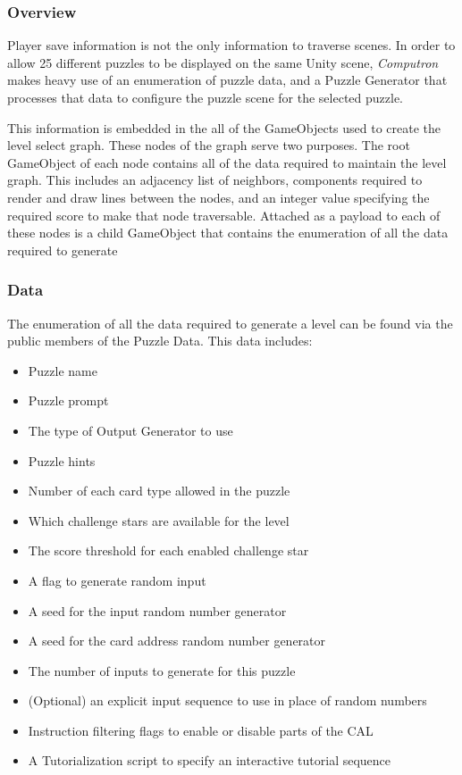 \subsubsection{Overview}
Player save information is not the only information to traverse scenes. In order to allow 25 different puzzles to be displayed on the same Unity scene, \textit{Computron} makes heavy use of an enumeration of puzzle data, and a Puzzle Generator that processes that data to configure the puzzle scene for the selected puzzle.

This information is embedded in the all of the GameObjects used to create the level select graph. These nodes of the graph serve two purposes. The root GameObject of each node contains all of the data required to maintain the level graph. This includes an adjacency list of neighbors, components required to render and draw lines between the nodes, and an integer value specifying the required score to make that node traversable. Attached as a payload to each of these nodes is a child GameObject that contains the enumeration of all the data required to generate   

\subsubsection{Data}
The enumeration of all the data required to generate a level can be found via the public members of the Puzzle Data. This data includes:

\begin{itemize}
    \item Puzzle name
    \item Puzzle prompt
    \item The type of Output Generator to use
    \item Puzzle hints
    \item Number of each card type allowed in the puzzle
    \item Which challenge stars are available for the level
    \item The score threshold for each enabled challenge star
    \item A flag to generate random input
    \item A seed for the input random number generator
    \item A seed for the card address random number generator
    \item The number of inputs to generate for this puzzle
    \item (Optional) an explicit input sequence to use in place of random numbers
    \item Instruction filtering flags to enable or disable parts of the CAL 
    \item A Tutorialization script to specify an interactive tutorial sequence
\end{itemize}

